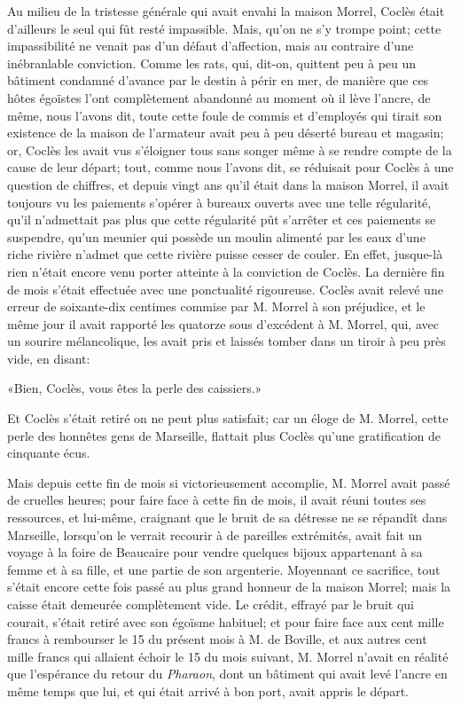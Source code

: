 Au milieu de la tristesse générale qui avait envahi la maison Morrel, Coclès était d'ailleurs le seul qui fût resté impassible. Mais, qu'on ne s'y trompe point; cette impassibilité ne venait pas d'un défaut d'affection, mais au contraire d'une inébranlable conviction. Comme les rats, qui, dit-on, quittent peu à peu un bâtiment condamné d'avance par le destin à périr en mer, de manière que ces hôtes égoïstes l'ont complètement abandonné au moment où il lève l'ancre, de même, nous l'avons dit, toute cette foule de commis et d'employés qui tirait son existence de la maison de l'armateur avait peu à peu déserté bureau et magasin; or, Coclès les avait vus s'éloigner tous sans songer même à se rendre compte de la cause de leur départ; tout, comme nous l'avons dit, se réduisait pour Coclès à une question de chiffres, et depuis vingt ans qu'il était dans la maison Morrel, il avait toujours vu les paiements s'opérer à bureaux ouverts avec une telle régularité, qu'il n'admettait pas plus que cette régularité pût s'arrêter et ces paiements se suspendre, qu'un meunier qui possède un moulin alimenté par les eaux d'une riche rivière n'admet que cette rivière puisse cesser de couler. En effet, jusque-là rien n'était encore venu porter atteinte à la conviction de Coclès. La dernière fin de mois s'était effectuée avec une ponctualité rigoureuse. Coclès avait relevé une erreur de soixante-dix centimes commise par M. Morrel à son préjudice, et le même jour il avait rapporté les quatorze sous d'excédent à M. Morrel, qui, avec un sourire mélancolique, les avait pris et laissés tomber dans un tiroir à peu près vide, en disant:

«Bien, Coclès, vous êtes la perle des caissiers.»

Et Coclès s'était retiré on ne peut plus satisfait; car un éloge de M. Morrel, cette perle des honnêtes gens de Marseille, flattait plus Coclès qu'une gratification de cinquante écus.

Mais depuis cette fin de mois si victorieusement accomplie, M. Morrel avait passé de cruelles heures; pour faire face à cette fin de mois, il avait réuni toutes ses ressources, et lui-même, craignant que le bruit de sa détresse ne se répandît dans Marseille, lorsqu'on le verrait recourir à de pareilles extrémités, avait fait un voyage à la foire de Beaucaire pour vendre quelques bijoux appartenant à sa femme et à sa fille, et une partie de son argenterie. Moyennant ce sacrifice, tout s'était encore cette fois passé au plus grand honneur de la maison Morrel; mais la caisse était demeurée complètement vide. Le crédit, effrayé par le bruit qui courait, s'était retiré avec son égoïsme habituel; et pour faire face aux cent mille francs à rembourser le 15 du présent mois à M. de Boville, et aux autres cent mille francs qui allaient échoir le 15 du mois suivant, M. Morrel n'avait en réalité que l'espérance du retour du \textit{Pharaon}, dont un bâtiment qui avait levé l'ancre en même temps que lui, et qui était arrivé à bon port, avait appris le départ.


